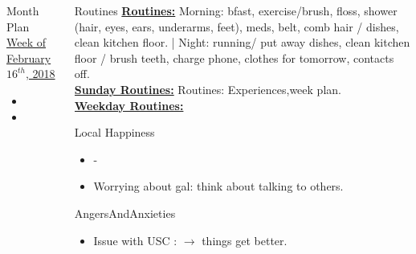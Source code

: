 \begin{columns}
\begin{column}{0.10\linewidth}
\begin{block}{Month Plan}
\underline{Week of February $16^{th}$, 2018}
\begin{itemize}
\tiny \item \tiny 
\item \tiny
\end{itemize}
\end{block}

\end{column}
  \begin{column}{0.10\linewidth}
    \begin{block}{Routines}
      { \tiny \underline{\bf Routines:} Morning: bfast, exercise/brush,
        floss, shower (hair, eyes, ears, underarms, feet), meds, belt,
        comb hair / dishes, clean kitchen floor. |  Night: running/ put
        away dishes, clean kitchen floor / brush teeth, charge phone,
        clothes for tomorrow, contacts off.}\\
      {\tiny \underline{\bf Sunday Routines:} Routines:
        Experiences,week plan.}\\ 
      {\tiny \underline{\bf Weekday Routines:}}\\
    \end{block} 
    \begin{block}{Local Happiness}
      \begin{itemize} 
        \tiny \item \tiny -
      \item \tiny Worrying about gal: think about talking to others.
      \end{itemize} 
    \end{block}
    \begin{block}{AngersAndAnxieties}
      \begin{itemize}
        \item \tiny Issue with USC : $\rightarrow$ things get better. 

\end{itemize}
\end{block}
\end{column}
\end{columns}

